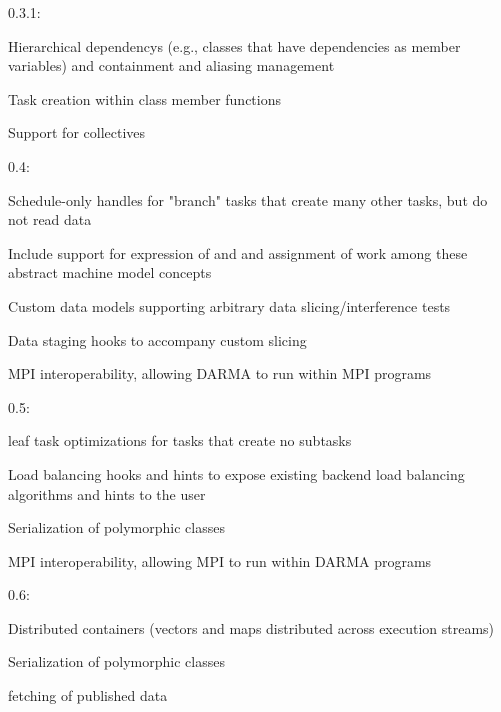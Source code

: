 \begin{compactdesc}
\item[0.3.1:]
\begin{compactitem}
\item Hierarchical \glspl{dependency} (e.g., classes that have dependencies as
member variables) and containment and aliasing management
\item Task creation within class member functions
\item Support for collectives
\end{compactitem}
\item[0.4:]
\begin{compactitem}
\item Schedule-only \glspl{handle} for "branch" \glspl{task} that create many other
  \glspl{task}, but do not read data
\item Include support for expression of  and
 and assignment of work among these abstract machine
model concepts
\item Custom data models supporting arbitrary data slicing/interference tests
\item Data staging hooks to accompany custom slicing
\item MPI interoperability, allowing DARMA to run within MPI programs
\end{compactitem}
\item[0.5:]
\begin{compactitem}
\item \Gls{leaf task} optimizations for \glspl{task} that create no
  \glspl{subtask}
\item Load balancing hooks and hints to expose existing backend load balancing algorithms and hints to the user
\item Serialization of polymorphic classes
\item MPI interoperability, allowing MPI to run within DARMA programs
\end{compactitem}
\item[0.6:]
\begin{compactitem}
\item Distributed containers (vectors and maps distributed across execution streams)
\item Serialization of polymorphic classes
\item {} \gls{fetch}ing of published data
\end{compactitem}
\end{compactdesc}

